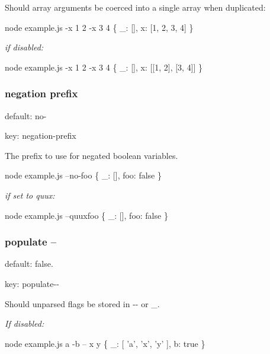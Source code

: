 Should array arguments be coerced into a single array when duplicated\+:


\begin{DoxyCode}
node example.js -x 1 2 -x 3 4
\{ \_: [], x: [1, 2, 3, 4] \}
\end{DoxyCode}


{\itshape if disabled\+:}


\begin{DoxyCode}
node example.js -x 1 2 -x 3 4
\{ \_: [], x: [[1, 2], [3, 4]] \}
\end{DoxyCode}


\subsubsection*{negation prefix}


\begin{DoxyItemize}
\item default\+: {\ttfamily no-\/}
\item key\+: {\ttfamily negation-\/prefix}
\end{DoxyItemize}

The prefix to use for negated boolean variables.


\begin{DoxyCode}
node example.js --no-foo
\{ \_: [], foo: false \}
\end{DoxyCode}


{\itshape if set to {\ttfamily quux}\+:}


\begin{DoxyCode}
node example.js --quuxfoo
\{ \_: [], foo: false \}
\end{DoxyCode}


\subsubsection*{populate --}


\begin{DoxyItemize}
\item default\+: {\ttfamily false}.
\item key\+: {\ttfamily populate-\/-\/}
\end{DoxyItemize}

Should unparsed flags be stored in {\ttfamily -\/-\/} or {\ttfamily \+\_\+}.

{\itshape If disabled\+:}


\begin{DoxyCode}
node example.js a -b -- x y
\{ \_: [ 'a', 'x', 'y' ], b: true \}
\end{DoxyCode}


